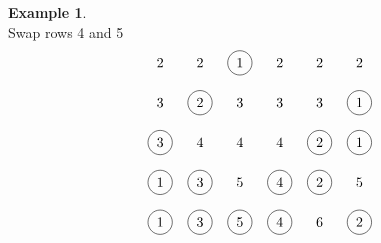 \documentclass[submission]{FPSAC2018}
\newcommand{\0}{\phantom{c}}
\theoremstyle{plain}
\theoremstyle{definition}
\newtheorem{example}[thm]{Example}
\numberwithin{equation}{section}
\begin{document}
\begin{example}
\[\]
Swap rows 4 and 5
\[
\begin{tikzpicture}\node at (0, 5){2};\node at (1, 5){2};\node[circle, draw=black] at (2, 5){1};\node at (3, 5){2};\node at (4, 5){2};\node at (5, 5){2};\node at (0, 4){3};\node[circle, draw=black] at (1, 4){2};\node at (2, 4){3};\node at (3, 4){3};\node at (4, 4){3};\node[circle, draw=black] at (5, 4){1};\node[circle, draw=black] at (0, 3){3};\node at (1, 3){4};\node at (2, 3){4};\node at (3, 3){4};\node[circle, draw=black] at (4, 3){2};\node[circle, draw=black] at (5, 3){1};\node[circle, draw=black] at (0, 2){1};\node[circle, draw=black] at (1, 2){3};\node at (2, 2){5};\node[circle, draw=black] at (3, 2){4};\node[circle, draw=black] at (4, 2){2};\node at (5, 2){5};\node[circle, draw=black] at (0, 1){1};\node[circle, draw=black] at (1, 1){3};\node[circle, draw=black] at (2, 1){5};\node[circle, draw=black] at (3, 1){4};\node at (4, 1){6};\node[circle, draw=black] at (5, 1){2};\end{tikzpicture}
\]
\end{example}




\printbibliography

%
\end{document}
